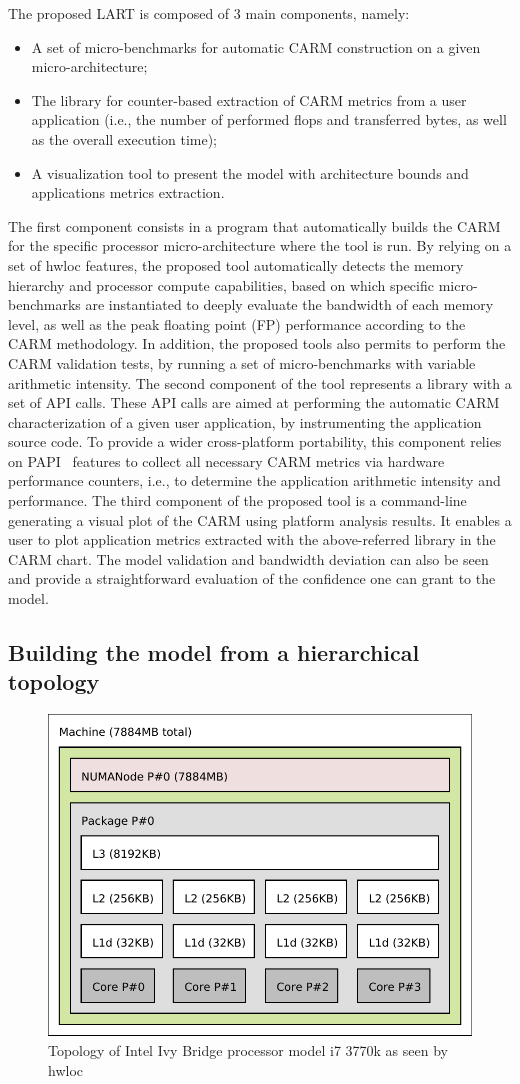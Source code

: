 \documentclass[twoside,twocolumn,9pt]{extarticle}
\begin{document}
The proposed LART is composed of 3 main components, namely:
\begin{itemize}
\item A set of micro-benchmarks for automatic CARM construction on a given micro-architecture;
\item The library for counter-based extraction  of CARM metrics from a user application (i.e., the number of performed flops and
  transferred bytes, as well as the overall execution time);
\item A visualization tool to present the model with architecture bounds and applications metrics extraction.
\end{itemize}

The first component consists in a program that automatically  builds the CARM for the specific processor micro-architecture where
the tool is run. By relying on a set of hwloc features, the proposed tool automatically detects the memory hierarchy and processor
compute capabilities, based on which specific micro-benchmarks are instantiated to deeply evaluate the bandwidth of each memory
level,  as well as the peak floating point (FP) performance according to the CARM methodology.
In addition, the proposed tools also permits to perform the CARM validation tests, by running a set of micro-benchmarks with
variable arithmetic intensity. 
The second component of the tool represents  a library with a set of API calls. These API calls are aimed at performing the
automatic CARM characterization of a given user application, by instrumenting the application source code.
To provide a wider cross-platform portability, this component relies on PAPI~\cite{mucci1999papi} features to collect all
necessary CARM metrics via hardware performance counters, i.e., to determine the application arithmetic intensity and performance.
The third component of the proposed tool is a command-line generating a visual plot of the CARM using platform analysis results. It
enables a user to plot application metrics extracted with the above-referred library in the CARM chart.
The model validation and bandwidth deviation can also be seen and provide a straightforward evaluation of the confidence one can
grant to the model.

\subsection{Building the model from a hierarchical topology}
\label{sub:model_build}

\begin{figure}
  \includegraphics[width=.48\textwidth]{pictures/i7_3770k.pdf}
  \caption{Topology of Intel Ivy Bridge processor model i7 3770k as seen by hwloc}
  \label{fig:topology_adriana}
\end{figure}
\end{document}
